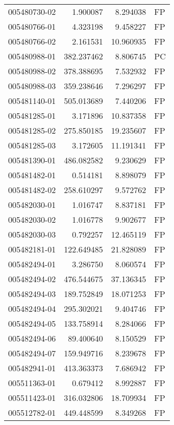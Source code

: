 \begin{tabular}{lrrl}
005480730-02 &    1.900087 &       8.294038 &   FP \\
005480766-01 &    4.323198 &       9.458227 &   FP \\
005480766-02 &    2.161531 &      10.960935 &   FP \\
005480988-01 &  382.237462 &       8.806745 &   PC \\
005480988-02 &  378.388695 &       7.532932 &   FP \\
005480988-03 &  359.238646 &       7.296297 &   FP \\
005481140-01 &  505.013689 &       7.440206 &   FP \\
005481285-01 &    3.171896 &      10.837358 &   FP \\
005481285-02 &  275.850185 &      19.235607 &   FP \\
005481285-03 &    3.172605 &      11.191341 &   FP \\
005481390-01 &  486.082582 &       9.230629 &   FP \\
005481482-01 &    0.514181 &       8.898079 &   FP \\
005481482-02 &  258.610297 &       9.572762 &   FP \\
005482030-01 &    1.016747 &       8.837181 &   FP \\
005482030-02 &    1.016778 &       9.902677 &   FP \\
005482030-03 &    0.792257 &      12.465119 &   FP \\
005482181-01 &  122.649485 &      21.828089 &   FP \\
005482494-01 &    3.286750 &       8.060574 &   FP \\
005482494-02 &  476.544675 &      37.136345 &   FP \\
005482494-03 &  189.752849 &      18.071253 &   FP \\
005482494-04 &  295.302021 &       9.404746 &   FP \\
005482494-05 &  133.758914 &       8.284066 &   FP \\
005482494-06 &   89.400640 &       8.150529 &   FP \\
005482494-07 &  159.949716 &       8.239678 &   FP \\
005482941-01 &  413.363373 &       7.686942 &   FP \\
005511363-01 &    0.679412 &       8.992887 &   FP \\
005511423-01 &  316.032806 &      18.709934 &   FP \\
005512782-01 &  449.448599 &       8.349268 &   FP \\

\end{tabular}
